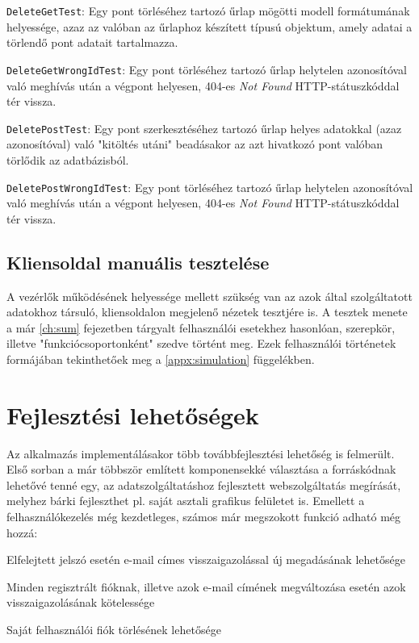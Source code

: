 \begin{compactitem}
	\item \texttt{DeleteGetTest}: Egy pont törléséhez tartozó űrlap mögötti modell formátumának helyessége, azaz az valóban az űrlaphoz készített típusú objektum, amely adatai a törlendő pont adatait tartalmazza.
	\item \texttt{DeleteGetWrongIdTest}: Egy pont törléséhez tartozó űrlap helytelen azonosítóval való meghívás után a végpont helyesen, 404-es \textit{Not Found} HTTP-státuszkóddal tér vissza.
	\item \texttt{DeletePostTest}: Egy pont szerkesztéséhez tartozó űrlap helyes adatokkal (azaz azonosítóval) való "kitöltés utáni" beadásakor az azt hivatkozó pont valóban törlődik az adatbázisból.
	\item \texttt{DeletePostWrongIdTest}: Egy pont törléséhez tartozó űrlap helytelen azonosítóval való meghívás után a végpont helyesen, 404-es \textit{Not Found} HTTP-státuszkóddal tér vissza.
\end{compactitem}

\subsection{Kliensoldal manuális tesztelése}
\label{subsec:manual_test}

A vezérlők működésének helyessége mellett szükség van az azok által szolgáltatott adatokhoz társuló, kliensoldalon megjelenő nézetek tesztjére is. A tesztek menete a már \ref{ch:sum} fejezetben tárgyalt felhasználói esetekhez hasonlóan, szerepkör, illetve "funkciócsoportonként" szedve történt meg. Ezek felhasználói történetek formájában tekinthetőek meg a \ref{appx:simulation} függelékben.

\section{Fejlesztési lehetőségek}

Az alkalmazás implementálásakor több továbbfejlesztési lehetőség is felmerült. Első sorban a már többször említett komponensekké választása a forráskódnak lehetővé tenné egy, az adatszolgáltatáshoz fejlesztett webszolgáltatás megírását, melyhez bárki fejleszthet pl. saját asztali grafikus felületet is. Emellett a felhasználókezelés még kezdetleges, számos már megszokott funkció adható még hozzá:
\begin{compactitem}
	\item Elfelejtett jelszó esetén e-mail címes visszaigazolással új megadásának lehetősége
	\item Minden regisztrált fióknak, illetve azok e-mail címének megváltozása esetén azok visszaigazolásának kötelessége
	\item Saját felhasználói fiók törlésének lehetősége
\end{compactitem}